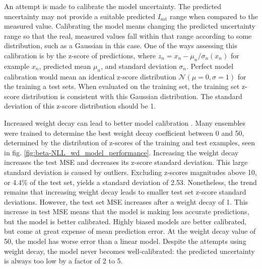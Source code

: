 An attempt is made to calibrate the model uncertainty. The predicted uncertainty may not provide a suitable predicted $I_\text{sat}$ range when compared to the measured value. Calibrating the model means changing the predicted uncertainty range so that the real, measured values fall within that range according to some distribution, such as a Gaussian in this case. One of the ways assessing this calibration is by the z-score of predictions, where $z_n=x_n - \mu_n / \sigma_n(x_n)$ for example $x_n$, predicted mean $\mu_n$, and standard deviation $\sigma_n$. Perfect model calibration would mean an identical z-score distribution $\mathcal{N}(\mu=0, \sigma=1)$ for the training a test sets. When evaluated on the training set, the training set z-score distribution is consistent with this Gaussian distribution. The standard deviation of this z-score distribution should be 1.

Increased weight decay can lead to better model calibration \cite{guo_calibration_2017}. Many ensembles were trained to determine the best weight decay coefficient between 0 and 50, determined by the distribution of z-scores of the training and test examples, seen in fig. \ref{fig:beta-NLL_wd_model_performance}. Increasing the weight decay increases the test MSE and decreases its z-score standard deviation. This large standard deviation is caused by outliers. Excluding z-scores magnitudes above 10, or 4.4\% of the test set, yields a standard deviation of 2.53. Nonetheless, the trend remains that increasing weight decay leads to smaller test set z-score standard deviations. However, the test set MSE increases after a weight decay of 1. This increase in test MSE means that the model is making less accurate predictions, but the model is better calibrated. Highly biased models are better calibrated, but come at great expense of mean prediction error. At the weight decay value of 50, the model has worse error than a linear model. Despite the attempts using weight decay, the model never becomes well-calibrated: the predicted uncertainty is always too low by a factor of 2 to 5. 

 

